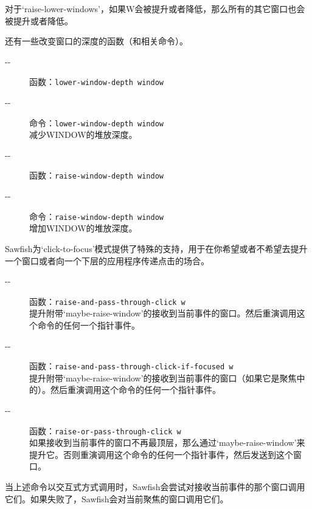 \documentclass{book}
\begin{document}
\begin{CJK*}{UTF8}{gbsn}
\begin{description}
\begin{description}
对于`raise-lower-windows'，如果W会被提升或者降低，那么所有的其它窗口也会被提升或者降低。
\end{description}

还有一些改变窗口的深度的函数（和相关命令）。
\begin{description}
\item[-{}-] 函数：\verb|lower-window-depth window|\\
\item[-{}-] 命令：\verb|lower-window-depth window|\\
减少WINDOW的堆放深度。
\item[-{}-] 函数：\verb|raise-window-depth window|\\
\item[-{}-] 命令：\verb|raise-window-depth window|\\
增加WINDOW的堆放深度。
\end{description}

Sawfish为`click-to-focus'模式提供了特殊的支持，用于在你希望或者不希望去提升一个窗口或者向一个下层的应用程序传递点击的场合。
\begin{description}
\item[-{}-] 函数：\verb|raise-and-pass-through-click w|\\
提升附带`maybe-raise-window'的接收到当前事件的窗口。然后重演调用这个命令的任何一个指针事件。
\item[-{}-] 函数：\verb|raise-and-pass-through-click-if-focused w|\\
提升附带`maybe-raise-window'的接收到当前事件的窗口（如果它是聚焦中的）。然后重演调用这个命令的任何一个指针事件。
\item[-{}-] 函数：\verb|raise-or-pass-through-click w|\\
如果接收到当前事件的窗口不再最顶层，那么通过`maybe-raise-window'来提升它。否则重演调用这个命令的任何一个指针事件，然后发送到这个窗口。
\end{description}

当上述命令以交互式方式调用时，Sawfish会尝试对接收当前事件的那个窗口调用它们。如果失败了，Sawfish会对当前聚焦的窗口调用它们。
\end{description}

\end{CJK*}
\end{document}
